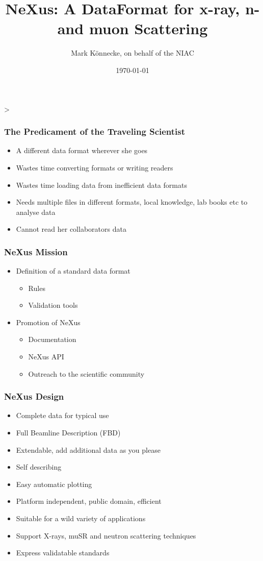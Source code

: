 \documentclass{beamer}
\title{NeXus: A DataFormat for x-ray, n- and muon Scattering}
\author{Mark K\"onnecke, on behalf of the NIAC }
\institute{Paul Scherrer Institute\\Switzerland }
\date{\today}
\begin{document}
\begin{frame}
\titlepage>
\end{frame}

\begin{frame}
\frametitle{The Predicament of the Traveling Scientist}
\begin{itemize}
\item<1->A different data format wherever she goes
\item<2->Wastes time converting formats or writing readers
\item<3->Wastes time loading data from inefficient data formats
\item<4->Needs multiple files in different formats, local knowledge, 
  lab books etc to analyse data
\item<5->Cannot read her collaborators data
\end{itemize}
\end{frame}

\begin{frame} \frametitle{NeXus Mission}
\begin{itemize}
\item Definition of a standard data format
\begin{itemize}
\item Rules
\item Validation tools
\end{itemize}
\item Promotion of NeXus
\begin{itemize}
\item Documentation
\item NeXus API
\item Outreach to the scientific community
\end{itemize}
\end{itemize}
\end{frame}


\begin{frame} \frametitle{NeXus Design}
\begin{itemize}
\item Complete data for typical use
\item Full Beamline Description (FBD)
\item Extendable, add additional data as you please
\item Self describing
\item Easy automatic plotting
\item Platform independent, public domain, efficient
\item Suitable for a wild variety of applications
\item Support X-rays, muSR and neutron scattering techniques
\item Express validatable standards
\end{itemize}
\end{frame}
\end{document}
